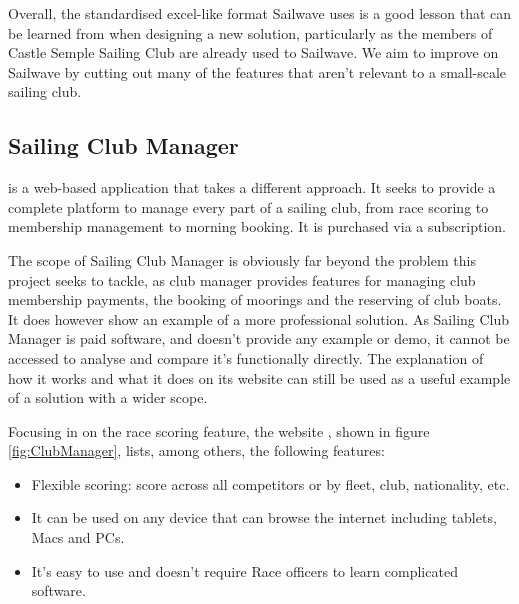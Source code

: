 \documentclass{l4proj}
\begin{document}
Overall, the standardised excel-like format Sailwave uses is a good lesson that can be learned from when designing a new solution, particularly as the members of Castle Semple Sailing Club are already used to Sailwave. We aim to improve on Sailwave by cutting out many of the features that aren't relevant to a small-scale sailing club.

\subsection{Sailing Club Manager}
\citet{ClubManager} is a web-based application that takes a different approach. It seeks to provide a complete platform to manage every part of a sailing club, from race scoring to membership management to morning booking. It is purchased via a subscription.

The scope of Sailing Club Manager is obviously far beyond the problem this project seeks to tackle, as club manager provides features for managing club membership payments, the booking of moorings and the reserving of club boats. It does however show an example of a more professional solution. As Sailing Club Manager is paid software, and doesn't provide any example or demo, it cannot be accessed to analyse and compare it's functionally directly. The explanation of how it works and what it does on its website can still be used as a useful example of a solution with a wider scope.

Focusing in on the race scoring feature, the website \citep{ClubManager}, shown in figure \ref{fig:ClubManager},  lists, among others, the following features:

\begin{itemize}
    \item
    Flexible scoring: score across all competitors or by fleet, club, nationality, etc.
    \item
    It can be used on any device that can browse the internet including tablets, Macs and PCs. 
    \item
    It's easy to use and doesn't require Race officers to learn complicated software. 
\end{itemize}
\end{document}
